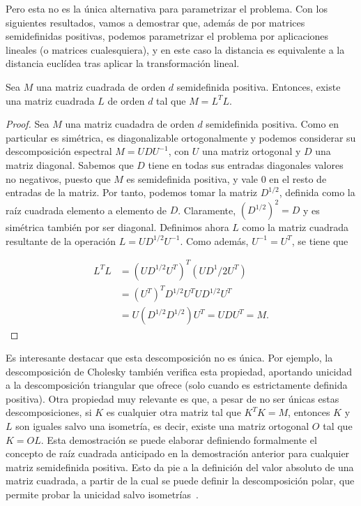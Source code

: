 Pero esta no es la única alternativa para parametrizar el problema. Con los siguientes resultados, vamos a demostrar que, además de por matrices semidefinidas positivas, podemos parametrizar el problema por aplicaciones lineales (o matrices cualesquiera), y en este caso la distancia es equivalente a la distancia euclídea tras aplicar la transformación lineal.


\begin{proposicion} \label{prop:descomp}
Sea $M$ una matriz cuadrada de orden $d$ semidefinida positiva. Entonces, existe una matriz cuadrada $L$ de orden $d$ tal que $M = L^TL$.
\end{proposicion}

\begin{proof}
    Sea $M$ una matriz cuadadra de orden $d$ semidefinida positiva. Como en particular es simétrica, es diagonalizable ortogonalmente y podemos considerar su descomposición espectral $M = UDU^{-1}$, con $U$ una matriz ortogonal y $D$ una matriz diagonal. Sabemos que $D$ tiene en todas sus entradas diagonales valores no negativos, puesto que $M$ es semidefinida positiva, y vale 0 en el resto de entradas de la matriz. Por tanto, podemos tomar la matriz $D^{1/2}$, definida como la raíz cuadrada elemento a elemento de $D$. Claramente, $(D^{1/2})^2 = D$ y es simétrica también por ser diagonal. Definimos ahora $L$ como la matriz cuadrada resultante de la operación $L = UD^{1/2}U^{-1}$. Como además, $U^{-1} = U^T$, se tiene que

    \begin{align*}
    L^TL &= (UD^{1/2}U^T)^T(UD^1/2U^T) \\
         &= (U^T)^TD^{1/2}U^TUD^{1/2}U^T \\
         &= U(D^{1/2}D^{1/2})U^T = UDU^T = M.
    \end{align*}
\end{proof}

Es interesante destacar que esta descomposición no es única. Por ejemplo, la descomposición de Cholesky también verifica esta propiedad, aportando unicidad a la descomposición triangular que ofrece (solo cuando es estrictamente definida positiva). Otra propiedad muy relevante es que, a pesar de no ser únicas estas descomposiciones, si $K$ es cualquier otra matriz tal que $K^TK = M$, entonces $K$ y $L$ son iguales salvo una isometría, es decir, existe una matriz ortogonal $O$ tal que $K = OL$. Esta demostración se puede elaborar definiendo formalmente el concepto de raíz cuadrada anticipado en la demostración anterior para cualquier matriz semidefinida positiva. Esto da pie a la definición del valor absoluto de una matriz cuadrada, a partir de la cual se puede definir la descomposición polar, que permite probar la unicidad salvo isometrías~\parencite{suarez2018tutorial}.

